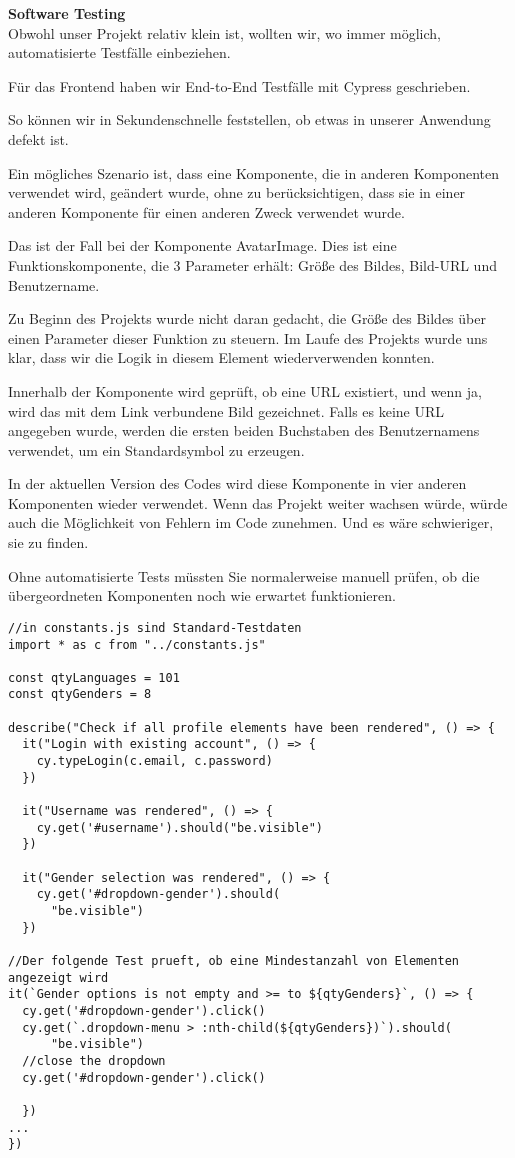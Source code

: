\textbf{Software Testing }\\
Obwohl unser Projekt relativ klein ist, wollten wir, wo immer möglich, automatisierte Testfälle einbeziehen.

Für das Frontend haben wir End-to-End Testfälle mit Cypress geschrieben.

So können wir in Sekundenschnelle feststellen, ob etwas in unserer Anwendung defekt ist.

Ein mögliches Szenario ist, dass eine Komponente, die in anderen Komponenten verwendet wird, geändert wurde, ohne zu berücksichtigen, dass sie in einer anderen Komponente für einen anderen Zweck verwendet wurde.

Das ist der Fall bei der Komponente AvatarImage.
Dies ist eine Funktionskomponente, die 3 Parameter erhält: Größe des Bildes, Bild-URL und Benutzername.

Zu Beginn des Projekts wurde nicht daran gedacht, die Größe des Bildes über einen Parameter dieser Funktion zu steuern. Im Laufe des Projekts wurde uns klar, dass wir die Logik in diesem Element wiederverwenden konnten.

Innerhalb der Komponente wird geprüft, ob eine URL existiert, und wenn ja, wird das mit dem Link verbundene Bild gezeichnet. Falls es keine URL  angegeben wurde, werden die ersten beiden Buchstaben des Benutzernamens verwendet, um ein Standardsymbol zu erzeugen.

In der aktuellen Version des Codes wird diese Komponente in vier anderen Komponenten wieder verwendet.
Wenn das Projekt weiter wachsen würde, würde auch die Möglichkeit von Fehlern im Code zunehmen. Und es wäre schwieriger, sie zu finden.

Ohne automatisierte Tests müssten Sie normalerweise manuell prüfen, ob die übergeordneten Komponenten noch wie erwartet funktionieren.


\begin{lstlisting}
//in constants.js sind Standard-Testdaten
import * as c from "../constants.js"

const qtyLanguages = 101
const qtyGenders = 8

describe("Check if all profile elements have been rendered", () => {
  it("Login with existing account", () => {
    cy.typeLogin(c.email, c.password)
  })

  it("Username was rendered", () => {
    cy.get('#username').should("be.visible")
  })

  it("Gender selection was rendered", () => {
    cy.get('#dropdown-gender').should(
      "be.visible")
  })

//Der folgende Test prueft, ob eine Mindestanzahl von Elementen angezeigt wird  
it(`Gender options is not empty and >= to ${qtyGenders}`, () => {
  cy.get('#dropdown-gender').click()
  cy.get(`.dropdown-menu > :nth-child(${qtyGenders})`).should(
      "be.visible")
  //close the dropdown
  cy.get('#dropdown-gender').click()

  })
...
})

\end{lstlisting}

